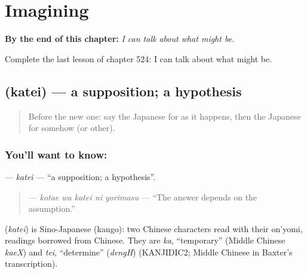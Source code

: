 
\chapter{Imagining}
\label{ch:ja-imagining}

\begin{chapteropening}
\textbf{By the end of this chapter:} \emph{I can talk about what might be.}

Complete the last lesson of chapter 524: I can talk about what might be.
\end{chapteropening}

\section[\texorpdfstring{\ja{かてい} (katei)}{かてい (katei)}]{ (katei) — a supposition; a hypothesis}

\label{lesson:JA-C524-katei}



\begin{quote}
Before the new one: say the Japanese for as it happens, then the Japanese for somehow (or other).
\end{quote}

\subsection*{You'll want to know: }
\textbf{} — \emph{katei} — \textquotedblleft{}a supposition; a hypothesis\textquotedblright{}.

\begin{quote}
\textbf{  } — \emph{kotae wa katei ni yorimasu} — \textquotedblleft{}The answer depends on the assumption.\textquotedblright{}
\end{quote}

\begin{cousinweb}
\textbf{} (\emph{katei}) is Sino-Japanese (kango): two Chinese characters read with their on'yomi, readings borrowed from Chinese. They are \emph{ka}, \textquotedblleft{}temporary\textquotedblright{} (Middle Chinese \emph{kaeX}) and \emph{tei}, \textquotedblleft{}determine\textquotedblright{} (\emph{dengH}) (KANJIDIC2; Middle Chinese in Baxter's transcription).
\end{cousinweb}

